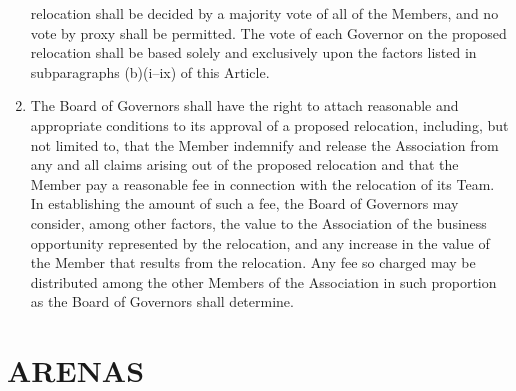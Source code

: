 \documentclass[]{book}
\theoremstyle{definition}
\theoremstyle{definition}
\theoremstyle{definition}
\theoremstyle{remark}
\begin{document}
\begin{enumerate}
  relocation shall be decided by a majority vote of all of the Members,
  and no vote by proxy shall be permitted. The vote of each Governor on
  the proposed relocation shall be based solely and exclusively upon the
  factors listed in subparagraphs (b)(i--ix) of this Article.
\item
  The Board of Governors shall have the right to attach reasonable and
  appropriate conditions to its approval of a proposed relocation,
  including, but not limited to, that the Member indemnify and release
  the Association from any and all claims arising out of the proposed
  relocation and that the Member pay a reasonable fee in connection with
  the relocation of its Team. In establishing the amount of such a fee,
  the Board of Governors may consider, among other factors, the value to
  the Association of the business opportunity represented by the
  relocation, and any increase in the value of the Member that results
  from the relocation. Any fee so charged may be distributed among the
  other Members of the Association in such proportion as the Board of
  Governors shall determine.
\end{enumerate}

\section{ARENAS}\label{arenas}
\end{document}
